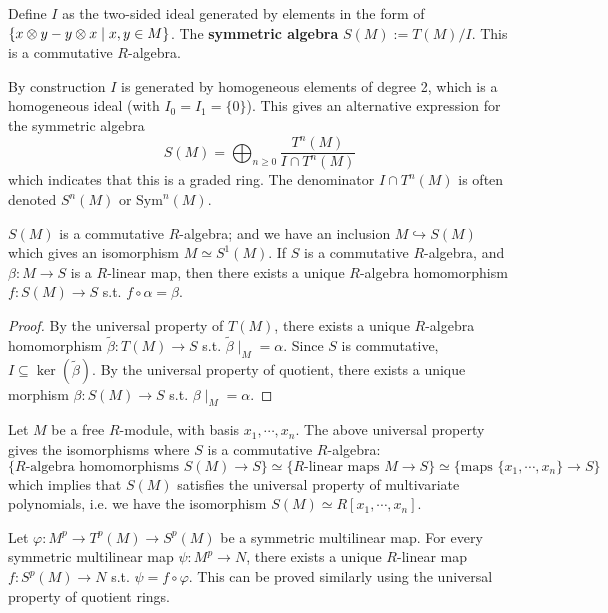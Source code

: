 \documentclass{article}
\begin{document}
\begin{definition}
    Define $I$ as the two-sided ideal generated by elements in the form of $\{x \otimes y - y \otimes x \mid x, y \in M\}$. The \textbf{symmetric algebra} $S(M) := T(M)/I$. This is a commutative $R$-algebra.
\end{definition}

\begin{remark}
    By construction $I$ is generated by homogeneous elements of degree 2, which is a homogeneous ideal (with $I_0 = I_1 = \{0\}$). This gives an alternative expression for the symmetric algebra 
    \[
        S(M) = \bigoplus_{n \geq 0} \frac{T^n(M)}{I \cap T^n(M)}
    \]
    which indicates that this is a graded ring. The denominator $I \cap T^n(M)$ is often denoted $S^n(M)$ or $\text{Sym}^n(M)$.
\end{remark}

\begin{proposition}
    $S(M)$ is a commutative $R$-algebra; and we have an inclusion $M \hookrightarrow S(M)$ which gives an isomorphism $M \simeq S^1(M)$. If $S$ is a commutative $R$-algebra, and $\beta: M \to S$ is a $R$-linear map, then there exists a unique $R$-algebra homomorphism $f: S(M) \to S$ s.t. $f \circ \alpha = \beta$.   
\end{proposition}

\begin{proof}
    By the universal property of $T(M)$, there exists a unique $R$-algebra homomorphism $\tilde{\beta}: T(M) \to S$ s.t. $\tilde{\beta} \mid_M = \alpha$. Since $S$ is commutative, $I \subseteq \ker (\tilde{\beta})$. By the universal property of quotient, there exists a unique morphism $\beta: S(M) \to S$ s.t. $\beta\mid_M = \alpha$.
\end{proof}

\begin{example}
    Let $M$ be a free $R$-module, with basis $x_1, \cdots, x_n$. The above universal property gives the isomorphisms where $S$ is a commutative $R$-algebra:
    \[
        \{ \text{$R$-algebra homomorphisms } S(M) \to S\} \simeq \{\text{$R$-linear maps $M \to S$}\} \simeq \{\text{maps } \{ x_1, \cdots, x_n \} \to S\}
    \]
    which implies that $S(M)$ satisfies the universal property of multivariate polynomials, i.e. we have the isomorphism $S(M) \simeq R[x_1, \cdots, x_n]$.
\end{example}

\begin{example}
    Let $\varphi: M^p \to T^p(M) \to S^p(M)$ be a symmetric multilinear map. For every symmetric multilinear map $\psi: M^p \to N$, there exists a unique $R$-linear map $f: S^p(M) \to N$ s.t. $\psi = f \circ \varphi$. This can be proved similarly using the universal property of quotient rings.
\end{example}
\end{document}
